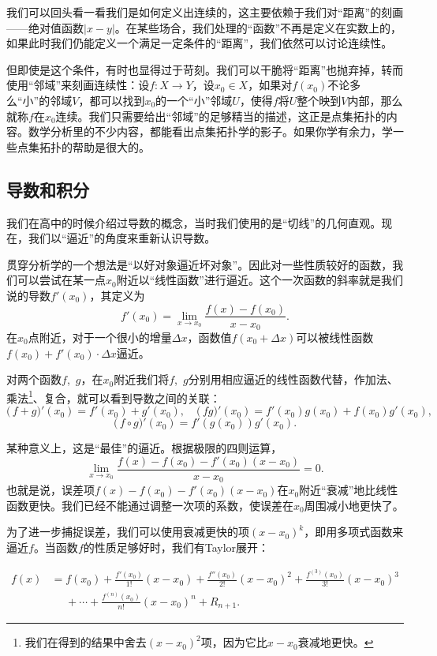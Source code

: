 我们可以回头看一看我们是如何定义出连续的，这主要依赖于我们对“距离”的刻画——绝对值函数$|x-y|$。在某些场合，我们处理的“函数”不再是定义在实数上的，如果此时我们仍能定义一个满足一定条件的“距离”，我们依然可以讨论连续性。

但即使是这个条件，有时也显得过于苛刻。我们可以干脆将“距离”也抛弃掉，转而使用“邻域”来刻画连续性：设$f:X\to Y$，设$x_0\in X$，如果对$f(x_0)$不论多么“小”的邻域$V$，都可以找到$x_0$的一个“小”邻域$U$，使得$f$将$U$整个映到$V$内部，那么就称$f$在$x_0$连续。我们只需要给出“邻域”的足够精当的描述，这正是点集拓扑的内容。数学分析里的不少内容，都能看出点集拓扑学的影子。如果你学有余力，学一些点集拓扑的帮助是很大的。
\subsection{导数和积分}

我们在高中的时候介绍过导数的概念，当时我们使用的是“切线”的几何直观。现在，我们以“逼近”的角度来重新认识导数。

贯穿分析学的一个想法是“以好对象逼近坏对象”。因此对一些性质较好的函数，我们可以尝试在某一点$x_0$附近以“线性函数”进行逼近。这个一次函数的斜率就是我们说的导数$f'(x_0)$，其定义为
\[f'(x_0)=\lim_{x\to x_0}\dfrac{f(x)-f(x_0)}{x-x_0}.\]
在$x_0$点附近，对于一个很小的增量$\Delta x$，函数值$f(x_0+\Delta x)$可以被线性函数$f(x_0)+f'(x_0)\cdot\Delta x$逼近。

对两个函数$f$,~$g$，在$x_0$附近我们将$f$,~$g$分别用相应逼近的线性函数代替，作加法、乘法\footnote{我们在得到的结果中舍去$(x-x_0)^2$项，因为它比$x-x_0$衰减地更快。}、复合，就可以看到导数之间的关联：
\[\bigl(\,f+g\bigr)'(x_0)=f'(x_0)+g'(x_0),\quad\bigl(\,fg\bigr)'(x_0)=f'(x_0)g(x_0)+f(x_0)g'(x_0),\]
\[\bigl(\,f\circ g\bigr)'(x_0)=f'(g(x_0))g'(x_0).\]

某种意义上，这是“最佳”的逼近。根据极限的四则运算，
\[\lim_{x\to x_0}\dfrac{f(x)-f(x_0)-f'(x_0)(x-x_0)}{x-x_0}=0.\]
也就是说，误差项$f(x)-f(x_0)-f'(x_0)(x-x_0)$在$x_0$附近“衰减”地比线性函数更快。我们已经不能通过调整一次项的系数，使误差在$x_0$周围减小地更快了。

为了进一步捕捉误差，我们可以使用衰减更快的项$(x-x_0)^k$，即用多项式函数来逼近$f$。当函数$f$的性质足够好时，我们有Taylor展开：

\begin{align*}
    f(x) & =  f(x_0)+\frac{f'(x_0)}{1!}(x-x_0)+\frac{f''(x_0)}{2!}(x-x_0)^2+\frac{f^{(3)}(x_0)}{3!}(x-x_0)^3 \\
         & \mathrel{\phantom{=}}+\cdots+\frac{f^{(n)}(x_0)}{n!}(x-x_0)^n+R_{n+1}.
\end{align*}


